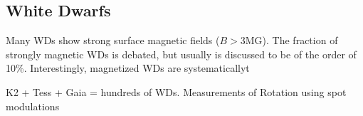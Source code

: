 {\color{red} \subsection{White Dwarfs}}
Many WDs show strong surface magnetic fields ($B>$3MG). The fraction of strongly magnetic WDs is debated, but usually is discussed to be of the order of 10\%. Interestingly, magnetized WDs are systematicallyt  

K2 + Tess + Gaia = hundreds of WDs. Measurements of Rotation using spot modulations